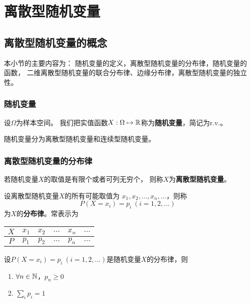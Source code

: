 \chapter{离散型随机变量}

\section{离散型随机变量的概念}
本小节的主要内容为：
随机变量的定义，离散型随机变量的分布律，随机变量的函数，
二维离散型随机变量的联合分布律、边缘分布律，离散型随机变量的独立性。

\subsection{随机变量}
\begin{definition}[随机变量]
  设$\Omega$为样本空间。
  我们把实值函数$X:\Omega\mapsto\mathbb{R}$称为\textbf{随机变量}，简记为r.v.。
\end{definition}

随机变量分为离散型随机变量和连续型随机变量。

\subsection{离散型随机变量的分布律}
\begin{definition}[离散型随机变量]
  若随机变量$X$的取值是有限个或者可列无穷个，
  则称$X$为\textbf{离散型随机变量}。
\end{definition}

\begin{definition}[离散型随机变量的分布律]
  设离散型随机变量$X$的所有可能取值为
  $x_1,x_2,\dots,x_n,\dots$，则称
  \begin{displaymath}
  P(X=x_i)=p_i\ (i=1,2,\dots)
  \end{displaymath}
  为$X$的\textbf{分布律}。常表示为
  \begin{center}
    \begin{tabular}{c|ccccc}
      $X$ & $x_1$ & $x_2$ & $\dots$ & $x_n$ & $\dots$ \\ 
      \hline 
      $P$ & $p_1$ & $p_2$ & $\dots$ & $p_n$ & $\dots$ \\ 
    \end{tabular} 
  \end{center}
\end{definition}

\begin{theorem}[离散型随机变量分布律的性质]
  设$P(X=x_i)=p_i\ (i=1,2,\dots)$是随机变量$X$的分布律，则
  \begin{enumerate}
    \item 
    $\forall n\in \mathbb{N}$，$p_n \ge 0$
    \item 
    $\sum_{i}p_i = 1$
  \end{enumerate}
\end{theorem}

